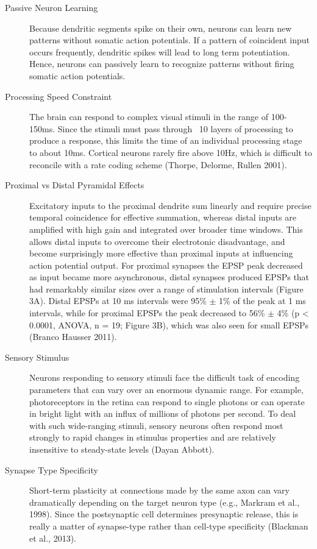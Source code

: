 \documentclass[11pt, a4paper]{article}
\begin{document}
\begin{description}
    \item[Passive Neuron Learning] Because dendritic segments spike on their own, neurons can learn new patterns without somatic action potentials. If a pattern of coincident input occurs frequently, dendritic spikes will lead to long term potentiation. Hence, neurons can passively learn to recognize patterns without firing somatic action potentials.

    \item[Processing Speed Constraint] The brain can respond to complex visual stimuli in the range of 100-150ms. Since the stimuli must pass through ~10 layers of processing to produce a response, this limits the time of an individual processing stage to about 10ms. Cortical neurons rarely fire above 10Hz, which is difficult to reconcile with a rate coding scheme (Thorpe, Delorme, Rullen 2001).

    \item[Proximal vs Distal Pyramidal Effects] Excitatory inputs to the proximal dendrite sum linearly and require precise temporal coincidence for effective summation, whereas distal inputs are amplified with high gain and integrated over broader time windows. This allows distal inputs to overcome their electrotonic disadvantage, and become surprisingly more effective than proximal inputs at influencing action potential output. For proximal synapses the EPSP peak decreased as input became more asynchronous, distal synapses produced EPSPs that had remarkably similar sizes over a range of stimulation intervals (Figure 3A). Distal EPSPs at 10 ms intervals were 95\% $\pm$ 1\% of the peak at 1 ms intervals, while for proximal EPSPs the peak decreased to 56\% $\pm$ 4\% (p < 0.0001, ANOVA, n = 19; Figure 3B), which was also seen for small EPSPs (Branco Hausser 2011).

    \item[Sensory Stimulus] Neurons responding to sensory stimuli face the difficult task of encoding parameters that can vary over an enormous dynamic range. For example, photoreceptors in the retina can respond to single photons or can operate in bright light with an influx of millions of photons per second. To deal with such wide-ranging stimuli, sensory neurons often respond most strongly to rapid changes in stimulus properties and are relatively insensitive to steady-state levels (Dayan Abbott). 

    \item[Synapse Type Specificity] Short-term plasticity at connections made by the same axon can vary dramatically depending on the target neuron type (e.g., Markram et al., 1998). Since the postsynaptic cell determines presynaptic release, this is really a matter of synapse-type rather than cell-type specificity (Blackman et al., 2013). 


\end{description}
\end{document}
